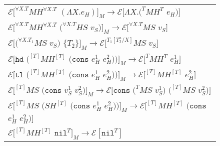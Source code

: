 \begin{figure}[p]
\begin{tabular}{l}
\vspace{5pt}

$\mathscr{E}[^{\forall X.T}MH^{\forall X.T}$ $(\Lambda X.e_{H})]_{M}\rightarrow\mathscr{E}[\Lambda X.(^{T}MH^{T}$ $e_{H})]$ \\

\vspace{5pt}

$\mathscr{E}[^{\forall X.T}MH^{\forall X.T}$ $(^{\forall X.T}HS$ $v_{S})]_{M}\rightarrow\mathscr{E}[^{\forall X.T}MS$ $v_{S}]$ \\

\vspace{5pt}

$\mathscr{E}[(^{\forall X.T_{1}}MS$ $v_{S})$ $\lbrace T_{2}\rbrace]_{M}\rightarrow\mathscr{E}[^{T_{1}[T^{a}_{2}/X]}MS$ $v_{S}]$ \\

\vspace{5pt}

$\mathscr{E}[\mathtt{hd}$ $(^{[T]}MH^{[T]}$ $(\mathtt{cons}$ $e_{H}^{1}$ $e_{H}^{2}))]_{M}\rightarrow\mathscr{E}[^{T}MH^{T}$ $e_{H}^{1}]$ \\

\vspace{5pt}

$\mathscr{E}[\mathtt{tl}$ $(^{[T]}MH^{[T]}$ $(\mathtt{cons}$ $e_{H}^{1}$ $e_{H}^{2}))]_{M}\rightarrow\mathscr{E}[^{[T]}MH^{[T]}$ $e_{H}^{2}]$ \\

\vspace{5pt}

$\mathscr{E}[^{[T]}MS$ $(\mathtt{cons}$ $v_{S}^{1}$ $v_{S}^{2})]_{M}\rightarrow\mathscr{E}[\mathtt{cons}$ $(^{T}MS$ $v_{S}^{1})$ $(^{[T]}MS$ $v_{S}^{2})]$ \\

\vspace{5pt}

$\mathscr{E}[^{[T]}MS$ $(SH^{[T]}$ $(\mathtt{cons}$ $e_{H}^{1}$ $e_{H}^{2}))]_{M}\rightarrow\mathscr{E}[^{[T]}MH^{[T]}$ $(\mathtt{cons}$ $e_{H}^{1}$ $e_{H}^{2})]$ \\

\vspace{5pt}

$\mathscr{E}[^{[T]}MH^{[T]}$ $\mathtt{nil}^{T}]_{M}\rightarrow\mathscr{E}[\mathtt{nil}^{T}]$ \\


\end{tabular}
\end{figure}
